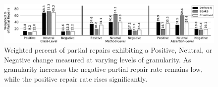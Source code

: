 \documentclass[10pt, conference]{IEEEtran}
\newcommand\todo[1]{\textcolor{red}{#1}}
\newcommand\bears{\textsc{Bears}\xspace}
\begin{document}

\begin{figure}
        \includegraphics[width=\textwidth]{img/weighted_percent.pdf}
        \caption{\small Weighted percent of partial repairs exhibiting a {\normalfont
            Positive}, {\normalfont Neutral}, or {\normalfont Negative} change
          measured at varying levels of granularity. As granularity increases
          the negative partial repair rate remains low, while the positive
          repair rate rises significantly.}
        \label{fig:fitness}
\end{figure}
\end{document}
